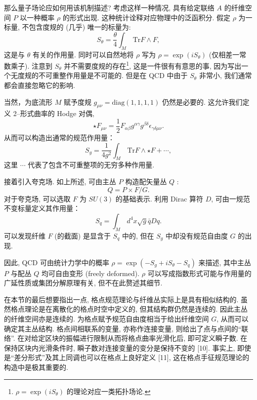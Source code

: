 \documentclass{article}
\begin{document}
\par 那么量子场论应如何用该机制描述? 考虑这样一种情况, 具有给定联络 $A$ 的纤维空间 $P$ 以一种概率 $\rho$ 的形式出现. 这种统计诠释对应物理中的泛函积分. 假定 $\rho$ 为一标量, 不包含度规的 (几乎) 唯一的标量为:
\begin{equation}
S_{\theta}=\frac{\theta}{4}\int_{M}\,\textrm{Tr}F\wedge F,
\end{equation}
这是与 $\theta$ 有关的作用量. 同时可以自然地将 $\rho$ 写为 $\rho=\exp(iS_{\theta})$ (仅相差一常数乘子). 注意到
 $S_{\theta}$ 并不需要度规的存在\footnote{$\rho=\exp(iS_{\theta})$ 的理论对应一类拓扑场论.}, 这是一件很有有意思的事,
 因为写出一个无度规的不可重整作用量是不可能的. 但是在 QCD 中由于 $S_{\theta}$ 非常小, 我们通常都会直接忽略它的影响.
\par 当然，为底流形 $M$ 赋予度规 $g_{\mu\nu}=\textrm{diag}(1,1,1,1)$ 仍然是必要的. 这允许我们定义 2--形式曲率的 Hodge 对偶,
\begin{equation}
\star F_{\mu\nu}=\frac{1}{2}F_{\alpha\beta}g^{\alpha\gamma}g^{\beta\delta}\epsilon_{\gamma\delta\mu\nu}.
\end{equation}
从而可以构造出通常的规范作用量：
\begin{equation}
S_{g}=\frac{1}{4g^{2}}\int_{M}\,\textrm{Tr}F\wedge\star F+ \cdots,
\end{equation}
这里 $\cdots$ 代表了包含不可重整项的无穷多种作用量.
\par 接着引入夸克场. 如上所述, 可由主丛 $P$ 构造配矢量丛 $Q$ :
\begin{equation}
Q=P\times F/G.
\end{equation}
对于夸克场, 可以选取 $F$ 为 $SU(3)$ 的基础表示. 利用 Dirac 算符 $D$, 可由一规范不变标量定义其作用量：
\begin{equation}
S_{q}=\int_{M}\,d^{4}x\sqrt{g}\bar{q}Dq.
\end{equation}
可以发现纤维 $F$ (的截面) 是显含于 $S_{q}$ 中的, 但在 $S_{g}$ 中却没有规范自由度 $G$ 的出现.

\par 因此, QCD 可由统计力学中的概率 $\rho=\exp{(-S_g +iS_\theta-S_q)}$ 来描述, 其中主丛 $P$ 与配丛 $Q$ 均可自由变形 (freely deformed). $\rho$ 可以写成指数形式可能与作用量的广延性质或集团分解原理有关, 但不在此赘述其细节.

\par 在本节的最后想要指出一点, 格点规范理论与纤维丛实际上是具有相似结构的. 虽然格点理论是在离散化的格点时空中定义的, 但其结构群仍然是连续的. 因此主丛的纤维空间亦是连续的. 为格点赋予规范自由度相当于给出纤维空间 $G$, 从而可以确定其主丛结构. 格点间相联系的变量, 亦称作连接变量, 则给出了点与点间的``联络''. 在对给定区块的振幅进行限制从而将格点曲率光滑化后, 即可定义瞬子数. 在保持区块内光滑条件时, 瞬子数对连接变量的变分是保持不变的 [10]. 事实上, 即使是``差分形式''及其上同调也可以在格点上良好定义 [11], 这在格点手征规范理论的构造中是极其重要的.
\end{document}
